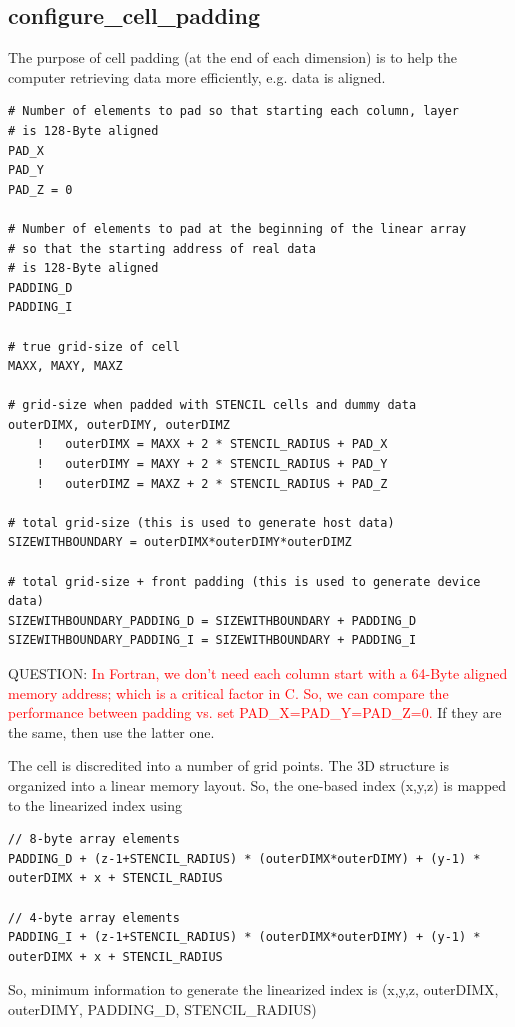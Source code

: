 \subsection{configure\_cell\_padding}
\label{sec:spatial_datapadding}

The purpose of cell padding (at the end of each dimension) is to help the
computer retrieving data more efficiently, e.g. data is aligned.
\begin{verbatim}
# Number of elements to pad so that starting each column, layer
# is 128-Byte aligned
PAD_X
PAD_Y
PAD_Z = 0

# Number of elements to pad at the beginning of the linear array
# so that the starting address of real data
# is 128-Byte aligned
PADDING_D
PADDING_I

# true grid-size of cell
MAXX, MAXY, MAXZ

# grid-size when padded with STENCIL cells and dummy data
outerDIMX, outerDIMY, outerDIMZ
    !   outerDIMX = MAXX + 2 * STENCIL_RADIUS + PAD_X
    !   outerDIMY = MAXY + 2 * STENCIL_RADIUS + PAD_Y
    !   outerDIMZ = MAXZ + 2 * STENCIL_RADIUS + PAD_Z

# total grid-size (this is used to generate host data)
SIZEWITHBOUNDARY = outerDIMX*outerDIMY*outerDIMZ

# total grid-size + front padding (this is used to generate device data)
SIZEWITHBOUNDARY_PADDING_D = SIZEWITHBOUNDARY + PADDING_D
SIZEWITHBOUNDARY_PADDING_I = SIZEWITHBOUNDARY + PADDING_I
\end{verbatim}



\begin{framed}
QUESTION: \textcolor{red}{In Fortran, we don't need each column start with a
64-Byte aligned memory address; which is a critical factor in C. So, we can compare the
performance between padding vs. set PAD\_X=PAD\_Y=PAD\_Z=0.} If they are the
same, then use the latter one. 
\end{framed}

The cell is discredited into a number of grid points. The 3D structure
is organized into a linear memory layout. So, the one-based index
(x,y,z) is mapped to the linearized index using
\begin{verbatim}
// 8-byte array elements
PADDING_D + (z-1+STENCIL_RADIUS) * (outerDIMX*outerDIMY) + (y-1) *
outerDIMX + x + STENCIL_RADIUS

// 4-byte array elements
PADDING_I + (z-1+STENCIL_RADIUS) * (outerDIMX*outerDIMY) + (y-1) *
outerDIMX + x + STENCIL_RADIUS
\end{verbatim}
So, minimum information to generate the linearized index is (x,y,z,
outerDIMX, outerDIMY, PADDING\_D, STENCIL\_RADIUS)



